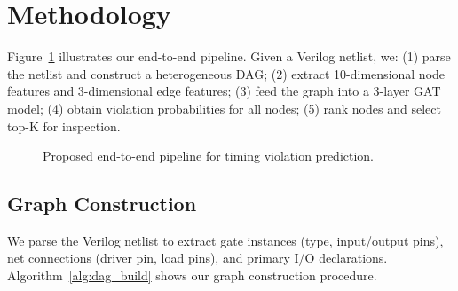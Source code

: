 
\section{Methodology}
\label{sec:method}

Figure~\ref{fig:pipeline} illustrates our end-to-end pipeline. Given a Verilog netlist, we: (1) parse the netlist and construct a heterogeneous DAG; (2) extract 10-dimensional node features and 3-dimensional edge features; (3) feed the graph into a 3-layer GAT model; (4) obtain violation probabilities for all nodes; (5) rank nodes and select top-K for inspection.

\begin{figure}[t]
\centering
{}
\caption{Proposed end-to-end pipeline for timing violation prediction.}
\label{fig:pipeline}
\end{figure}

\subsection{Graph Construction}

We parse the Verilog netlist to extract gate instances (type, input/output pins), net connections (driver pin, load pins), and primary I/O declarations. Algorithm~\ref{alg:dag_build} shows our graph construction procedure.


